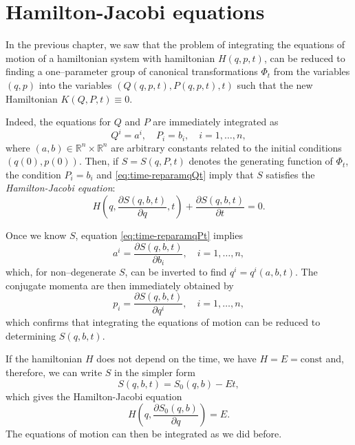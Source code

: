 \documentclass[english,fontsize=11pt,paper=a5,oneside]{scrbook}
\newcommand{\R}{\mathbb{R}}
\theoremstyle{definition}
\begin{document}
\section{Hamilton-Jacobi equations}

In the previous chapter, we saw that the problem of integrating the equations of motion of a hamiltonian system with hamiltonian $H(q,p,t)$, can be reduced to finding a one--parameter group of canonical transformations $\Phi_t$ from the variables $(q,p)$ into the variables $(Q(q,p,t), P(q,p,t), t)$ such that the new Hamiltonian $K(Q,P,t) \equiv 0$.

Indeed, the equations for $Q$ and $P$ are immediately integrated as
\begin{equation}
  Q^i = a^i, \quad
  P_i = b_i, \quad
  i = 1,\ldots,n,
\end{equation}
where $(a,b)\in\R^{n}\times\R^n$ are arbitrary constants related to the initial conditions $(q(0), p(0))$.
Then, if $S = S(q,P,t)$ denotes the generating function of $\Phi_t$, the condition $P_i=b_i$ and \eqref{eq:time-reparamqQt} imply that $S$ satisfies the \emph{Hamilton-Jacobi equation}:
\begin{equation}\label{eq:Hamilton-Jacobi}
  H\left(q, \frac{\partial S(q,b,t)}{\partial q}, t\right) + \frac{\partial S(q,b,t)}{\partial t} = 0.
\end{equation}

Once we know $S$, equation \eqref{eq:time-reparamqPt} implies
\begin{equation}
  a^i = \frac{\partial S(q,b,t)}{\partial b_i}, \quad i =1,\ldots,n,
\end{equation}
which, for non--degenerate $S$, can be inverted to find $q^i = q^i(a,b,t)$.
The conjugate momenta are then immediately obtained by
\begin{equation}
  p_i = \frac{\partial S(q,b,t)}{\partial q^i}, \quad i =1,\ldots,n,
\end{equation}
which confirms that integrating the equations of motion can be reduced to determining $S(q,b,t)$.

If the hamiltonian $H$ does not depend on the time, we have $H=E=\mathrm{const}$ and, therefore, we can write $S$ in the simpler form
\begin{equation}
  S(q,b,t) = S_0(q,b) - E t,
\end{equation}
which gives the Hamilton-Jacobi equation
\begin{equation}\label{eq:HJnotime}
  H\left(q, \frac{\partial S_0(q,b)}{\partial q}\right) = E.
\end{equation}
The equations of motion can then be integrated as we did before.
\end{document}
